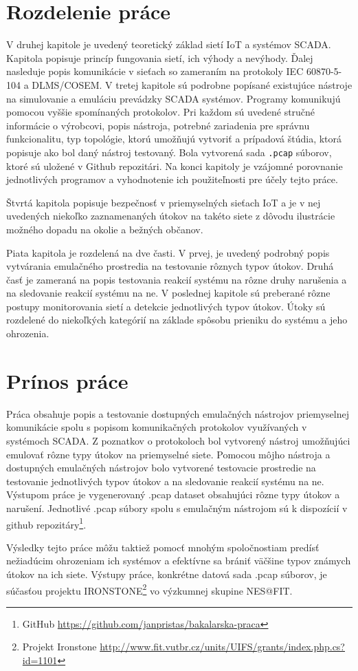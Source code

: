 \section{Rozdelenie práce}
\tab V druhej kapitole je uvedený teoretický základ sietí IoT a systémov SCADA. Kapitola popisuje princíp fungovania sietí, ich výhody a nevýhody. Ďalej nasleduje popis komunikácie v sieťach so zameraním na protokoly IEC 60870-5-104 a DLMS/COSEM. V tretej kapitole sú podrobne popísané existujúce nástroje na simulovanie a emuláciu prevádzky SCADA systémov. Programy komunikujú pomocou vyššie spomínaných protokolov. Pri každom sú uvedené stručné informácie o výrobcovi, popis nástroja, potrebné zariadenia pre správnu funkcionalitu, typ topológie, ktorú umožňujú vytvoriť a prípadová štúdia, ktorá popisuje ako bol daný nástroj testovaný. Bola vytvorená sada {\tt .pcap} súborov, ktoré sú uložené v Github repozitári. Na konci kapitoly je vzájomné porovnanie jednotlivých programov a vyhodnotenie ich použiteľnosti pre účely tejto práce. \par
Štvrtá kapitola popisuje bezpečnosť v priemyselných sieťach IoT a je v nej uvedených niekoľko zaznamenaných útokov na takéto siete z dôvodu ilustrácie možného dopadu na okolie a bežných občanov. \par
Piata kapitola je rozdelená na dve časti. V prvej, je uvedený podrobný popis vytvárania emulačného prostredia na testovanie rôznych typov útokov. Druhá časť je zameraná na popis testovania reakcií systému na rôzne druhy narušenia a na sledovanie reakcií systému na ne.
V poslednej kapitole sú preberané rôzne postupy monitorovania sietí a detekcie jednotlivých typov útokov. Útoky sú rozdelené do niekoľkých kategórií na základe spôsobu prieniku do systému a jeho ohrozenia. 
\section{Prínos práce}
\tab Práca obsahuje popis a testovanie dostupných emulačných nástrojov priemyselnej komunikácie spolu s popisom komunikačných protokolov využívaných v systémoch SCADA. Z poznatkov o protokoloch bol vytvorený nástroj umožňujúci emulovať rôzne typy útokov na priemyselné siete. Pomocou môjho nástroja a dostupných emulačných nástrojov bolo vytvorené testovacie prostredie na testovanie jednotlivých typov útokov a na sledovanie reakcií systému na ne. Výstupom práce je vygenerovaný .pcap dataset obsahujúci rôzne typy útokov a narušení. Jednotlivé .pcap súbory spolu s emulačným nástrojom sú k dispozícií v github repozitáry\footnote{GitHub \url{https://github.com/janpristas/bakalarska-praca}}. \par
Výsledky tejto práce môžu taktiež pomocť mnohým spoločnostiam predísť nežiadúcim ohrozeniam ich systémov a efektívne sa brániť väčšine typov známych útokov na ich siete. Výstupy práce, konkrétne datová sada .pcap súborov, je súčasťou projektu IRONSTONE\footnote{Projekt Ironstone \url{http://www.fit.vutbr.cz/units/UIFS/grants/index.php.cs?id=1101}} vo výzkumnej skupine NES@FIT.